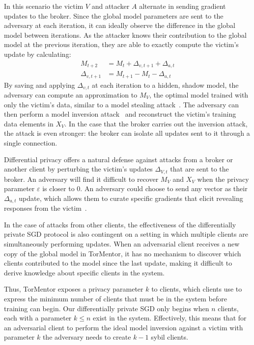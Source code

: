 In this scenario the victim $V$ and attacker $A$ alternate in sending
gradient updates to the broker. Since the global model parameters are
sent to the adversary at each iteration, it can ideally observe the
difference in the global model between iterations. As the attacker
knows their contribution to the global model at the previous
iteration, they are able to exactly compute the victim's update by
calculating:
\begin{align*}
  M_{t+2} &= M_t + \Delta_{v,t+1} + \Delta_{a,t} \\
  \Delta_{v,t+1} &= M_{t+1} - M_t - \Delta_{a,t}
\end{align*}
By saving and applying $\Delta_{v,t}$ at each iteration to a hidden,
shadow model, the adversary can compute an approximation to $M_V$,
the optimal model trained with only the victim's data, similar to a
model stealing attack~\cite{Tramer:2016}. The adversary can then
perform a model inversion attack~\cite{Fredrikson:2014,
Fredrikson:2015} and reconstruct the victim's training data elements
in $X_V$. In the case that the broker carries out the inversion attack,
the attack is even stronger: the broker can isolate all updates sent to
it through a single connection.

Differential privacy offers a natural defense against attacks from a
broker or another client by perturbing the victim's updates $\Delta_
{V,t}$ that are sent to the broker. An adversary will find it difficult
to recover $M_V$ and $X_V$ when the privacy parameter $\varepsilon$ is
closer to 0. An adversary could choose to send any vector as their
$\Delta_{a,t}$ update, which allows them to curate specific gradients
that elicit revealing responses from the victim~\cite{Hitaj:2017}.

In the case of attacks from other clients, the effectiveness of
the differentially private SGD protocol is also contingent on a setting
in which multiple clients are simultaneously performing updates. When
an adversarial client receives a new copy of the global model in
TorMentor, it has no mechanism to discover which clients contributed to
the model since the last update, making it difficult to derive
knowledge about specific clients in the system. 

Thus, TorMentor exposes a privacy parameter $k$ to clients, which
clients use to express the minimum number of clients that must be in
the system before training can begin. Our differentially private SGD
only begins when $n$ clients, each with a parameter $k \le n$ exist in
the system. Effectively, this means that for an adversarial client to
perform the ideal model inversion against a victim with parameter $k$
the adversary needs to create $k-1$ sybil clients.

